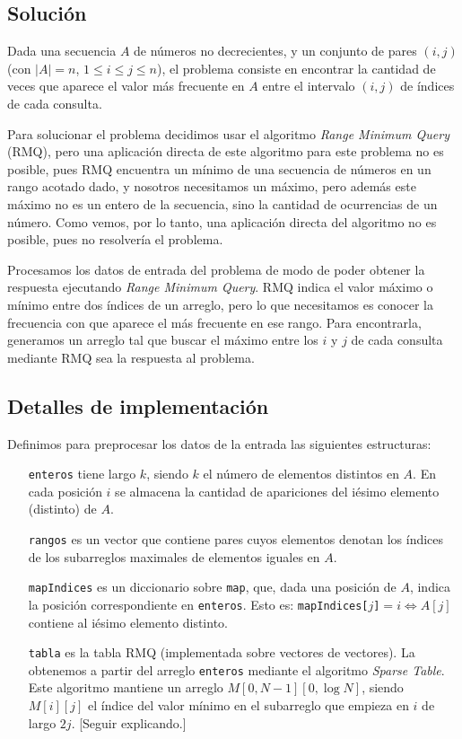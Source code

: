 \subsection*{Solución}

Dada una secuencia $A$ de números no decrecientes, y un conjunto de pares $(i,j)$
(con $|A|=n$, $1 \le i \le j \le n$), el problema consiste en encontrar la cantidad
de veces que aparece el valor más frecuente en $A$ entre el intervalo $(i,j)$
de índices de cada consulta.

Para solucionar el problema decidimos usar el algoritmo {\sl Range Minimum Query}
(RMQ), pero una aplicación directa de este algoritmo para este problema no es posible,
pues RMQ encuentra un mínimo de una secuencia de números en un rango acotado dado, y nosotros
necesitamos un máximo, pero además este máximo no es un entero de la secuencia,
sino la cantidad de ocurrencias de un número. Como vemos, por lo tanto, una aplicación
directa del algoritmo no es posible, pues no resolvería el problema.

Procesamos los datos de entrada del problema de modo de poder obtener la
respuesta ejecutando {\sl Range Minimum Query}. RMQ indica el valor máximo o
mínimo entre dos índices de un arreglo, pero lo que necesitamos es conocer la
frecuencia con que aparece el más frecuente en ese rango. Para encontrarla,
generamos un arreglo tal que buscar el máximo entre los $i$ y $j$ de cada
consulta mediante RMQ sea la respuesta al problema.

\subsection*{Detalles de implementación}

Definimos para preprocesar los datos de la entrada las siguientes estructuras:

\begin{itemize}
  \item[\tt enteros] tiene largo $k$, siendo $k$ el número de elementos
  distintos en $A$. En cada posición $i$ se almacena la cantidad de apariciones
  del iésimo elemento (distinto) de $A$.

  \item[\tt rangos] es un vector que contiene pares cuyos elementos denotan
  los índices de los subarreglos maximales de elementos iguales en $A$.

  \item[\tt mapIndices] es un diccionario sobre {\tt map}, que, dada una
  posición de $A$, indica la posición correspondiente en {\tt enteros}. Esto es:
  {\tt mapIndices[$j$]}$=i \Leftrightarrow A[j]$ contiene al iésimo elemento
  distinto.

  \item[\tt tabla] es la tabla RMQ (implementada sobre vectores de vectores).
  La obtenemos a partir del arreglo {\tt enteros} mediante el algoritmo {\sl
  Sparse Table}. Este algoritmo mantiene un arreglo $M[0,N-1][0,\log N]$,
  siendo $M[i][j]$ el índice del valor mínimo en el subarreglo que empieza en
  $i$ de largo $2j$. [Seguir explicando.] \cite{topcoder}
\end{itemize}

